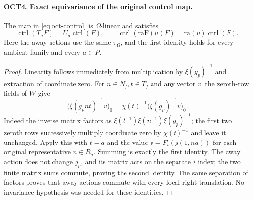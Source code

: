 \paragraph{OCT4. Exact equivariance of the original control map.}
\label{claim:OCT4}
The map in \eqref{eq:oct-control} is $\Omega$-linear and satisfies
\begin{equation}\label{eq:oct-equivariance}
 \operatorname{ctrl}(T_aF)=U_a\operatorname{ctrl}(F),\qquad
 \operatorname{ctrl}(\mathrm{raF}(u)F)
                         =\mathrm{ra}(u)\operatorname{ctrl}(F).
\end{equation}
Here the away actions use the same $\tau_\Omega$, and the first
identity holds for every ambient family and every $a\in P$.
\begin{proof}
Linearity follows immediately from multiplication by
$\xi(g_p)^{-1}$ and extraction of coordinate zero.  For
$n\in N_f,t\in T_f$ and any vector $v$, the zeroth-row fields
of $W$ give
\[
 \bigl(\xi(g_pnt)^{-1}v\bigr)_0
      =\chi(t)^{-1}\bigl(\xi(g_p)^{-1}v\bigr)_0.
\]
Indeed the inverse matrix factors as
$\xi(t^{-1})\xi(n^{-1})\xi(g_p)^{-1}$; the first two zeroth
rows successively multiply coordinate zero by $\chi(t)^{-1}$
and leave it unchanged.  Apply this with $t=a$ and the value
$v=F_i(g(1,na))$ for each original representative $n\in R_a$.
Summing is exactly the first identity.  The away action does
not change $g_p$, and its matrix acts on the separate $i$ index;
the two finite matrix sums commute, proving the second identity.
The same separation of factors proves that away actions commute
with every local right translation.  No invariance hypothesis
was needed for these identities.
\end{proof}

